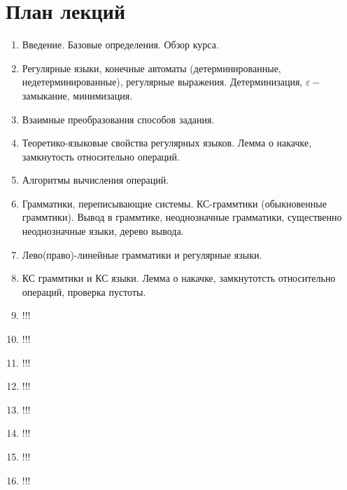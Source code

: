 \section{План лекций}
\begin{enumerate}
  \item Введение. Базовые определения. Обзор курса.
  \item Регулярные языки, конечные автоматы (детерминированные, недетерминированные), регулярные выражения. Детерминизация, $\varepsilon-$замыкание, минимизация.
  \item Взаимные преобразования способов задания.
  \item Теоретико-языковые свойства регулярных языков. Лемма о накачке, замкнутость относительно операций.
  \item Алгоритмы вычисления операций.
  \item Грамматики, переписывающие системы. КС-граммтики (обыкновенные граммтики). Вывод в граммтике, неоднозначные грамматики, существенно неоднозначные языки, дерево вывода.
  \item Лево(право)-линейные грамматики и регулярные языки.
  \item КС граммтики и КС языки. Лемма о накачке, замкнутотсть относительно операций, проверка пустоты.
  \item !!!
  \item !!!
  \item !!!
  \item !!!
  \item !!!
  \item !!!
  \item !!!
  \item !!!
\end{enumerate}

